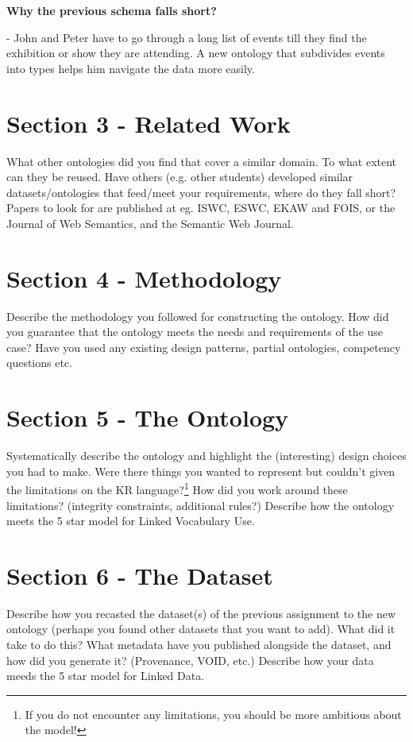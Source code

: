\documentclass[runningheads,a4paper]{../../StyleFiles/llncs}
\begin{document}
\textbf{Why the previous schema falls short?}

- John and Peter have to go through a long list of events till they find the exhibition or show they are attending. A new ontology that subdivides events into types helps him navigate the data more easily. 



\section{Section 3 - Related Work}
What other ontologies did you find that cover a similar domain. To what extent can they be reused. Have others (e.g. other students) developed similar datasets/ontologies that feed/meet your requirements, where do they fall short? Papers to look for are published at eg. ISWC, ESWC, EKAW and FOIS, or the Journal of Web Semantics, and the Semantic Web Journal.

\section{Section 4 - Methodology}
Describe the methodology you followed for constructing the ontology. How did you guarantee that the ontology meets the needs and requirements of the use case? Have you used any existing design patterns, partial ontologies, competency questions etc.

\section{Section 5 - The Ontology}
Systematically describe the ontology and highlight the (interesting) design choices you had to make. Were there things you wanted to represent but couldn't given the limitations on the KR language?\footnote{If you do not encounter any limitations, you should be more ambitious about the model!} How did you work around these limitations? (integrity constraints, additional rules?) Describe how the ontology meets the 5 star model for Linked Vocabulary Use.

\section{Section 6 - The Dataset}
Describe how you recasted the dataset(s) of the previous assignment to the new ontology (perhaps you found other datasets that you want to add). What did it take to do this? What metadata have you published alongside the dataset, and how did you generate it? (Provenance, VOID, etc.) Describe how your data meeds the 5 star model for Linked Data.
\end{document}
